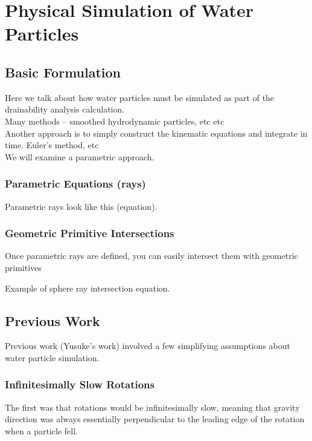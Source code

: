 						\chapter{Physical Simulation of Water Particles}

\section{Basic Formulation}

Here we talk about how water particles must be simulated as part of the drainability analysis calculation.
\\

Many methods -- smoothed hydrodynamic particles, etc etc
\\

Another approach is to simply construct the kinematic equations and integrate in time. Euler's method, etc
\\

We will examine a parametric approach.
\\

	\subsection{Parametric Equations (rays)}

Parametric rays look like this (equation).


	\subsection{Geometric Primitive Intersections}

Once parametric rays are defined, you can easily intersect them with geometric primitives

Example of sphere ray intersection equation.


\section{Previous Work}

Previous work (Yusuke's work) involved a few simplifying assumptions about water particle simulation.
\\

	\subsection{Infinitesimally Slow Rotations}
The first was that rotations would be infinitesimally slow, meaning that gravity direction was always essentially perpendicular to the leading edge of the rotation when a particle fell.


